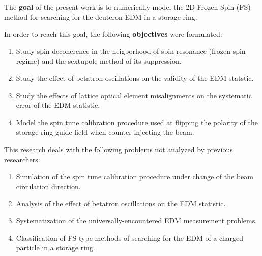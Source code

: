 The \textbf{goal} of the present work is to numerically model the 2D Frozen Spin (FS) method 
for searching for the deuteron EDM in a storage ring.

In order to reach this goal, the following \textbf{objectives} were formulated:
\begin{enumerate}
  \item Study spin decoherence in the neigborhood of spin resonance (frozen spin regime) and the sextupole
  method of its suppression. 
  \item Study the effect of betatron oscillations on the validity of the EDM statstic.
  \item Study the effects of lattice optical element misalignments on the systematic error of the EDM statistic.
  \item Model the spin tune calibration procedure used at flipping the polarity of the storage ring guide field
  when counter-injecting the beam.
\end{enumerate}

This research deals with the following problems not analyzed by previous researchers:
\begin{enumerate}[(1)]
  \item Simulation of the spin tune calibration procedure under change of the beam circulation direction. 
  \item Analysis of the effect of betatron oscillations on the EDM statistic.
  \item Systematization of the universally-encountered EDM measurement problems.
  \item Classification of FS-type methods of searching for the EDM of a charged particle in a storage ring.
\end{enumerate}

